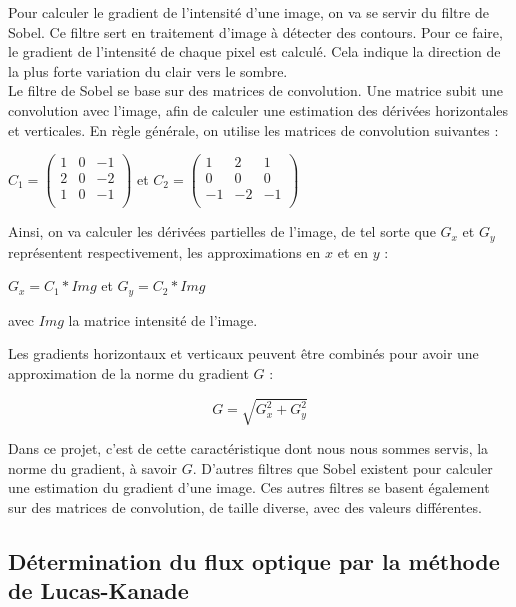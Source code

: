 Pour calculer le gradient de l'intensité d'une image, on va se servir du filtre de Sobel. Ce filtre sert en traitement d'image à détecter des contours. Pour ce faire, le gradient de l'intensité de chaque pixel est calculé. Cela indique la direction de la plus forte variation du clair vers le sombre.\\

Le filtre de Sobel se base sur des matrices de convolution. Une matrice subit une convolution avec l'image, afin de calculer une estimation des dérivées horizontales et verticales. En règle générale, on utilise les matrices de convolution suivantes :

\begin{center}
$
	C_1 = \begin{pmatrix}
		1 & 0 & -1 \\
		2 & 0 & -2 \\
		1 & 0 & -1 \\
	\end{pmatrix}
$
 et 
$	
	C_2 = \begin{pmatrix}
		1 & 2 & 1 \\
		0 & 0 & 0 \\
		-1 & -2 & -1 \\
	\end{pmatrix}
$
\end{center}

Ainsi, on va calculer les dérivées partielles de l'image, de tel sorte que $G_x$ et $G_y$ représentent respectivement, les approximations en $x$ et en $y$ :

\begin{center}
$
	G_x = C_1 \ast Img
$
 et 
$	
	G_y = C_2 \ast Img
$
\end{center}
avec $Img$ la matrice intensité de l'image.

Les gradients horizontaux et verticaux peuvent être combinés pour avoir une approximation de la norme du gradient $G$ : 

\[
	G = \sqrt{G_x^2 + G_y^2}
\]

Dans ce projet, c'est de cette caractéristique dont nous nous sommes servis, la norme du gradient, à savoir $G$. D'autres filtres que Sobel existent pour calculer une estimation du gradient d'une image. Ces autres filtres se basent également sur des matrices de convolution, de taille diverse, avec des valeurs différentes.

\subsection{Détermination du flux optique par la méthode de Lucas-Kanade}

